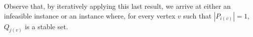 \documentclass[preprint, 11pt, authoryear]{elsarticle}
\newtheorem{lemma}{Lemma}[section]
\newcommand{\PP}{{\mathcal P}}
\newcommand{\QQ}{{\mathcal Q}}
\newcommand{\dpcn}[1]{\chi_{DP}(#1)}
\begin{document}
Observe that, by iteratively applying this last result, we arrive at either an infeasible instance or an instance where, for every vertex $v$ such that $|P_{i(v)}| = 1$, $Q_{j(v)}$ is a stable set.








\end{document}
